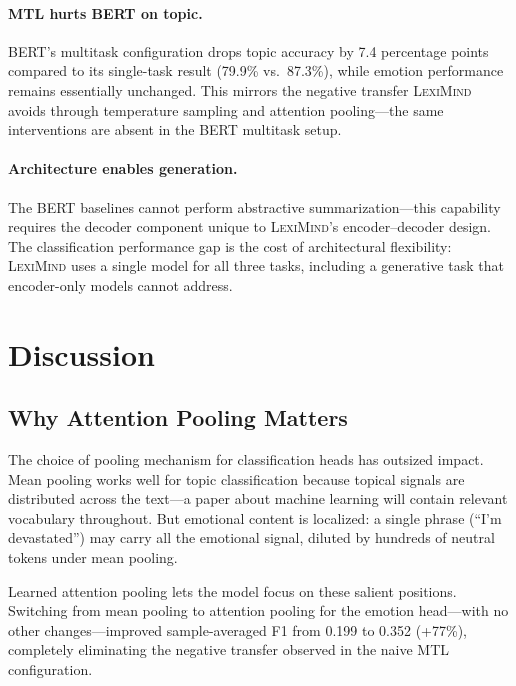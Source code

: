 \documentclass[11pt,a4paper]{article}
\newcommand{\lexiname}{\textsc{LexiMind}}
\begin{document}
\paragraph{MTL hurts BERT on topic.}
BERT's multitask configuration drops topic accuracy by 7.4 percentage points compared to its single-task result (79.9\% vs.\ 87.3\%), while emotion performance remains essentially unchanged.
This mirrors the negative transfer \lexiname{} avoids through temperature sampling and attention pooling---the same interventions are absent in the BERT multitask setup.

\paragraph{Architecture enables generation.}
The BERT baselines cannot perform abstractive summarization---this capability requires the decoder component unique to \lexiname{}'s encoder--decoder design.
The classification performance gap is the cost of architectural flexibility: \lexiname{} uses a single model for all three tasks, including a generative task that encoder-only models cannot address.

\section{Discussion}
\label{sec:discussion}

\subsection{Why Attention Pooling Matters}

The choice of pooling mechanism for classification heads has outsized impact.
Mean pooling works well for topic classification because topical signals are distributed across the text---a paper about machine learning will contain relevant vocabulary throughout.
But emotional content is localized: a single phrase (``I'm devastated'') may carry all the emotional signal, diluted by hundreds of neutral tokens under mean pooling.

Learned attention pooling lets the model focus on these salient positions.
Switching from mean pooling to attention pooling for the emotion head---with no other changes---improved sample-averaged F1 from 0.199 to 0.352 (+77\%), completely eliminating the negative transfer observed in the naive MTL configuration.
\end{document}
